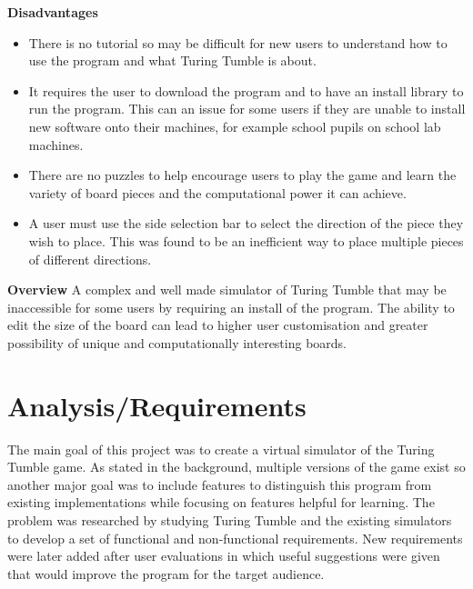 \documentclass{l4proj}
\begin{document}
\textbf{Disadvantages}
\begin{itemize}
    \item There is no tutorial so may be difficult for new users to understand how to use the program and what Turing Tumble is about.
    \item It requires the user to download the program and to have an install library to run the program. This can an issue for some users if they are unable to install new software onto their machines, for example school pupils on school lab machines.
    \item There are no puzzles to help encourage users to play the game and learn the variety of board pieces and the computational power it can achieve.
    \item A user must use the side selection bar to select the direction of the piece they wish to place. This was found to be an inefficient way to place multiple pieces of different directions.
\end{itemize}

\textbf{Overview}
A complex and well made simulator of Turing Tumble that may be inaccessible for some users by requiring an install of the program. The ability to edit the size of the board can lead to higher user customisation and greater possibility of unique and computationally interesting boards. 
\chapter{Analysis/Requirements}
\label{section:reqs}



The main goal of this project was to create a virtual simulator of the Turing Tumble game. As stated in the background, multiple versions of the game exist so another major goal was to include features to distinguish this program from existing implementations while focusing on features helpful for learning. The problem was researched by studying Turing Tumble and the existing simulators to develop a set of functional and non-functional requirements. New requirements were later added after user evaluations in which useful suggestions were given that would improve the program for the target audience.
\end{document}
